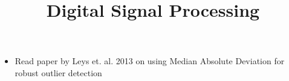 \documentclass{../template/texnote}
\title{Digital Signal Processing}
\begin{document}
    \maketitle {}
	\begin{itemize}
		\item Read paper by Leys et. al. 2013 on using Median Absolute Deviation for robust outlier detection
	\end{itemize}
    \printbibliography
\end{document}
